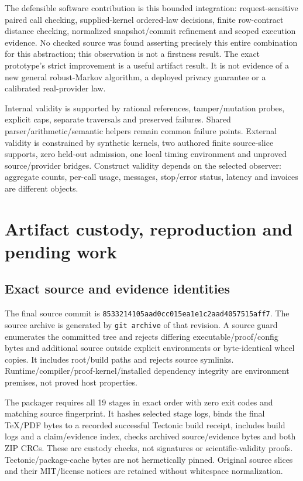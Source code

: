 \documentclass[11pt,a4paper]{article}
\newcommand{\SourceRevision}{8533214105aad0cc015ea1e1c2aad4057515aff7}
\begin{document}
The defensible software contribution is this bounded integration: request-sensitive paired call checking, supplied-kernel ordered-law decisions, finite row-contract distance checking, normalized snapshot/commit refinement and scoped execution evidence. No checked source was found asserting precisely this entire combination for this abstraction; this observation is not a firstness result. The exact prototype's strict improvement is a useful artifact result. It is not evidence of a new general robust-Markov algorithm, a deployed privacy guarantee or a calibrated real-provider law.

Internal validity is supported by rational references, tamper/mutation probes, explicit caps, separate traversals and preserved failures. Shared parser/arithmetic/semantic helpers remain common failure points. External validity is constrained by synthetic kernels, two authored finite source-slice supports, zero held-out admission, one local timing environment and unproved source/provider bridges. Construct validity depends on the selected observer: aggregate counts, per-call usage, messages, stop/error status, latency and invoices are different objects.

\section{Artifact custody, reproduction and pending work}
\subsection{Exact source and evidence identities}
The final source commit is \texttt{\SourceRevision}. The source archive is generated by \texttt{git archive} of that revision. A source guard enumerates the committed tree and rejects differing executable/proof/config bytes and additional source outside explicit environments or byte-identical wheel copies. It includes root/build paths and rejects source symlinks. Runtime/compiler/proof-kernel/installed dependency integrity are environment premises, not proved host properties.

The packager requires all 19 stages in exact order with zero exit codes and matching source fingerprint. It hashes selected stage logs, binds the final TeX/PDF bytes to a recorded successful Tectonic build receipt, includes build logs and a claim/evidence index, checks archived source/evidence bytes and both ZIP CRCs. These are custody checks, not signatures or scientific-validity proofs. Tectonic/package-cache bytes are not hermetically pinned. Original source slices and their MIT/license notices are retained without whitespace normalization.
\end{document}
